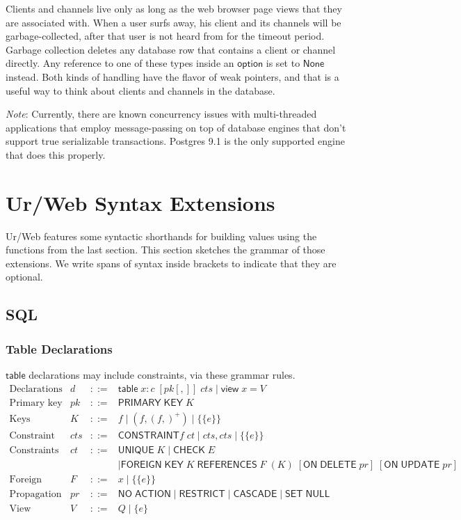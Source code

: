 \documentclass{article}
\newcommand{\mt}[1]{\mathsf{#1}}
\begin{document}
Clients and channels live only as long as the web browser page views that they are associated with.  When a user surfs away, his client and its channels will be garbage-collected, after that user is not heard from for the timeout period.  Garbage collection deletes any database row that contains a client or channel directly.  Any reference to one of these types inside an $\mt{option}$ is set to $\mt{None}$ instead.  Both kinds of handling have the flavor of weak pointers, and that is a useful way to think about clients and channels in the database.

\emph{Note}: Currently, there are known concurrency issues with multi-threaded applications that employ message-passing on top of database engines that don't support true serializable transactions.  Postgres 9.1 is the only supported engine that does this properly.


\section{Ur/Web Syntax Extensions}

Ur/Web features some syntactic shorthands for building values using the functions from the last section.  This section sketches the grammar of those extensions.  We write spans of syntax inside brackets to indicate that they are optional.

\subsection{SQL}

\subsubsection{\label{tables}Table Declarations}

$\mt{table}$ declarations may include constraints, via these grammar rules.
$$\begin{array}{rrcll}
  \textrm{Declarations} & d &::=& \mt{table} \; x : c \; [pk[,]] \; cts \mid \mt{view} \; x = V \\
  \textrm{Primary key constraints} & pk &::=& \mt{PRIMARY} \; \mt{KEY} \; K \\
  \textrm{Keys} & K &::=& f \mid (f, (f,)^+) \mid \{\{e\}\} \\
  \textrm{Constraint sets} & cts &::=& \mt{CONSTRAINT} f \; ct \mid cts, cts \mid \{\{e\}\} \\
  \textrm{Constraints} & ct &::=& \mt{UNIQUE} \; K \mid \mt{CHECK} \; E \\
  &&& \mid \mt{FOREIGN} \; \mt{KEY} \; K \; \mt{REFERENCES} \; F \; (K) \; [\mt{ON} \; \mt{DELETE} \; pr] \; [\mt{ON} \; \mt{UPDATE} \; pr] \\
  \textrm{Foreign tables} & F &::=& x \mid \{\{e\}\} \\
  \textrm{Propagation modes} & pr &::=& \mt{NO} \; \mt{ACTION} \mid \mt{RESTRICT} \mid \mt{CASCADE} \mid \mt{SET} \; \mt{NULL} \\
  \textrm{View expressions} & V &::=& Q \mid \{e\}
\end{array}$$
\end{document}
